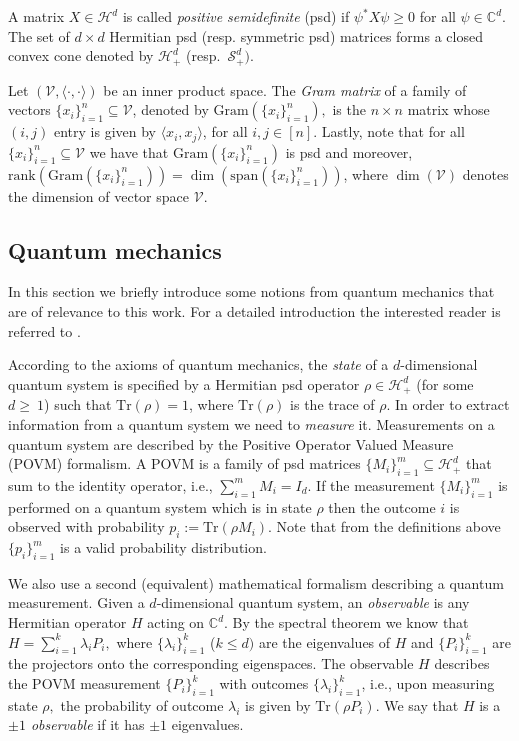 \documentclass{siamart}
\begin{document}
{{{{A matrix $X\in{\mathcal{H}}^d$ is called {\em positive semidefinite} (psd) if
$\psi^*X\psi\ge 0$ for all $\psi\in {\mathbb{C}}^d$. The set of $d\times d$
Hermitian psd (resp. symmetric psd) matrices forms a closed convex
cone  denoted by ${\mathcal{H}}^d_+$ (resp.~${\mathcal{S}}^d_+)$.

Let $\left(\mathcal{V},{\langle} \cdot,\cdot{\rangle}\right)$ be an inner
product space. The  {\em Gram matrix} of a family of vectors
$\{x_i\}_{i=1}^n\subseteq \mathcal{V}$, denoted by
${\mathrm{Gram}}({\{x_i\}_{i=1}^n}),$ is the  $n\times n$ matrix whose
{$(i,j)$} entry is given by ${\langle} x_i,x_j{\rangle}$, for all $i,j\in [n].$
Lastly, note that for all   $\{x_i\}_{i=1}^n\subseteq \mathcal{V}$
we have that ${\mathrm{Gram}}( \{x_i\}_{i=1}^n)$ is psd and moreover, {${\mathrm{rank}}
\left({\mathrm{Gram}}( \{x_i\}_{i=1}^n)\right)=\dim (
{\mathrm{span}}(\{x_i\}_{i=1}^n))$}, {where $\dim (\mathcal{V})$ denotes  the dimension of
vector space $\mathcal{V}$}.

\subsection*{Quantum mechanics}

In this {section} we briefly introduce {some notions  from  quantum mechanics} that are of relevance  to this work. For a detailed introduction the interested  reader is  referred to \cite{NC00}.

According to the axioms of quantum mechanics, the \emph{state}  of a
{$d$-dimensional} quantum system is specified by a Hermitian psd
operator $\rho \in {\mathcal{H}}^d_+$ (for some $d\ge~1$) such that
${\mathrm{Tr}}(\rho)=1$, {where ${\mathrm{Tr}}(\rho)$ is the trace of $\rho$}. {In
order} to extract information from a quantum system   we need to
{\emph{measure}} it. Measurements on a quantum system are described
by the {Positive Operator Valued Measure} (POVM) formalism. A POVM
is  a family of psd  matrices ${\{M_i\}_{i=1}^m} \subseteq
{\mathcal{H}}^d_+$ that sum to the identity operator, i.e., $\sum_{i=1}^m
M_i=I_d $. If the measurement ${\{M_i\}_{i=1}^m}$ is performed on a
quantum system {which is} in state $\rho$ then the outcome $i$ is
observed with probability $p_{i}:={\mathrm{Tr}}(\rho M_i)$. Note  that  from
the definitions above $\{p_i\}_{i=1}^m$  is  a valid probability
distribution.

 We also
 {use}
  a second (equivalent) mathematical  formalism  describing  a quantum  measurement. Given a $d$-dimensional quantum system, an  {\em observable} is any  Hermitian operator  $H$ acting on ${\mathbb{C}}^d$.  By the spectral theorem we know that $H=\sum_{i=1}^k\lambda_iP_i,$ where  $\{ \lambda_i\}_{i=1}^k$ ($k\le d)$ are the eigenvalues of $H$ and $\{P_i\}_{i=1}^k$ {are} the projectors {onto} the corresponding eigenspaces. The observable $H$ describes {the} POVM measurement {$\{P_i\}_{i=1}^k$} with outcomes $\{\lambda_i\}_{i=1}^k$, {i.e., upon} measuring state $\rho,$ the probability of  outcome $\lambda_i$ is given by  ${\mathrm{Tr}}(\rho P_i)$.
  We say that $H$ is a {\em $\pm 1$  observable} if {it has $\pm 1$ eigenvalues.}

}}}}
\end{document}
